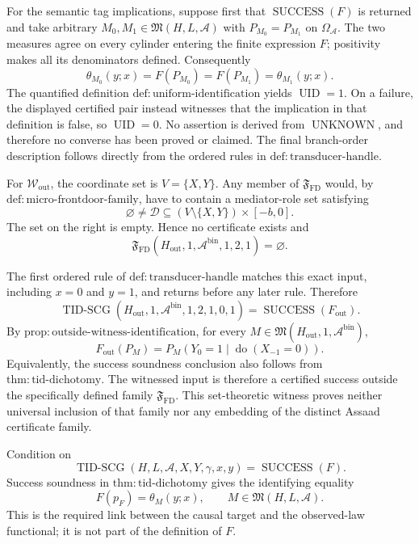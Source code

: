 For the semantic tag implications, suppose first that \(\operatorname{SUCCESS}(F)\) is returned and take arbitrary \(M_0,M_1\in\mathfrak M(H,L,\mathcal A)\) with \(P_{M_0}=P_{M_1}\) on \(\Omega_{\mathcal A}\).  The two measures agree on every cylinder entering the finite expression \(F\); positivity makes all its denominators defined.  Consequently
\[
 \theta_{M_0}(y;x)=F(P_{M_0})=F(P_{M_1})=\theta_{M_1}(y;x).
\]
The quantified definition \(\mathrm{def:uniform\text{-}identification}\) yields \(\operatorname{UID}=1\).  On a failure, the displayed certified pair instead witnesses that the implication in that definition is false, so \(\operatorname{UID}=0\).  No assertion is derived from \(\operatorname{UNKNOWN}\), and therefore no converse has been proved or claimed.  The final branch-order description follows directly from the ordered rules in \(\mathrm{def:transducer\text{-}handle}\).

For \(\mathcal W_{\mathrm{out}}\), the coordinate set is \(V=\{X,Y\}\).  Any member of \(\mathfrak F_{\mathrm{FD}}\) would, by \(\mathrm{def:micro\text{-}frontdoor\text{-}family}\), have to contain a mediator-role set satisfying
\[
 \varnothing\ne\mathcal D
 \subseteq(V\setminus\{X,Y\})\times[-b,0].
\]
The set on the right is empty.  Hence no certificate exists and
\[
 \mathfrak F_{\mathrm{FD}}(H_{\mathrm{out}},1,\mathcal A^{\mathrm{bin}},1,2,1)
 =\varnothing.
\]

The first ordered rule of \(\mathrm{def:transducer\text{-}handle}\) matches this exact input, including \(x=0\) and \(y=1\), and returns before any later rule.  Therefore
\[
 \operatorname{TID\text{-}SCG}(H_{\mathrm{out}},1,
 \mathcal A^{\mathrm{bin}},1,2,1,0,1)
 =\operatorname{SUCCESS}(F_{\mathrm{out}}).
\]
By \(\mathrm{prop:outside\text{-}witness\text{-}identification}\), for every \(M\in\mathfrak M(H_{\mathrm{out}},1,\mathcal A^{\mathrm{bin}})\),
\[
 F_{\mathrm{out}}(P_M)
 =P_M(Y_0=1\mid\operatorname{do}(X_{-1}=0)).
\]
Equivalently, the success soundness conclusion also follows from \(\mathrm{thm:tid\text{-}dichotomy}\).  The witnessed input is therefore a certified success outside the specifically defined family \(\mathfrak F_{\mathrm{FD}}\).  This set-theoretic witness proves neither universal inclusion of that family nor any embedding of the distinct Assaad certificate family.

Condition on
\[
 \operatorname{TID\text{-}SCG}(H,L,\mathcal A,X,Y,\gamma,x,y)
 =\operatorname{SUCCESS}(F).
\]
Success soundness in \(\mathrm{thm:tid\text{-}dichotomy}\) gives the identifying equality
\[
 F(p_F)=\theta_M(y;x),
 \qquad M\in\mathfrak M(H,L,\mathcal A).
\]
This is the required link between the causal target and the observed-law functional; it is not part of the definition of \(F\).

